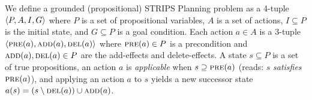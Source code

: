 %
\def\conditionset{P}
%
%
%
%
\def\condition{\conditionset}
\def\satisfies{\supseteq}
%
%
%
%
%
%
%
%
We define a grounded (propositional) STRIPS Planning problem
as a 4-tuple ${\left<P,A,I,G\right>}$
where
$P$ is a set of propositional variables,
$A$ is a set of actions,
$I\subseteq P$ is the initial state, and
$G\subseteq \conditionset$ is a goal condition.
%
%
%
%
%
Each action $a\in A$ is a 3-tuple ${\left<\textsc{pre}(a),\textsc{add}(a),\textsc{del}(a)\right>}$ where
%
%
%
$\pre(a) \in \condition$ is a precondition and
%
%
$\textsc{add}(a), \textsc{del}(a)\in P$ are the add-effects and delete-effects.
%
%
%
%
%
%
A state $s\subseteq \conditionset$ is a set of true propositions,
%
an action $a$ is \emph{applicable} when $s \satisfies \pre(a)$ (reads: $s$ \emph{satisfies} $\textsc{pre}(a)$),
and applying an action $a$ to $s$ yields a new successor state
%
%
$a(s) = (s \setminus \textsc{del}(a)) \cup \textsc{add}(a)$.
%
%
